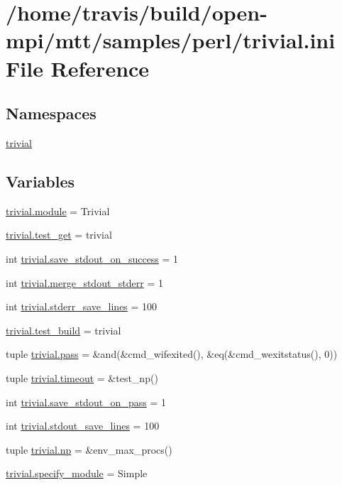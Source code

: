 \hypertarget{trivial_8ini}{\section{/home/travis/build/open-\/mpi/mtt/samples/perl/trivial.ini File Reference}
\label{trivial_8ini}
}
\subsection*{Namespaces}
\begin{DoxyCompactItemize}
\item 
\hyperlink{namespacetrivial}{trivial}
\end{DoxyCompactItemize}
\subsection*{Variables}
\begin{DoxyCompactItemize}
\item 
\hyperlink{namespacetrivial_a3e713ea5d6e77bf165eeaafc02275430}{trivial.\-module} = Trivial
\item 
\hyperlink{namespacetrivial_afe75cace659f04749ee3f7c818152b7b}{trivial.\-test\-\_\-get} = trivial
\item 
int \hyperlink{namespacetrivial_af272dc5ab194f706f77eeb74de7b8c97}{trivial.\-save\-\_\-stdout\-\_\-on\-\_\-success} = 1
\item 
int \hyperlink{namespacetrivial_a8c1d5357654e053cf4d0b8a7f48ff13b}{trivial.\-merge\-\_\-stdout\-\_\-stderr} = 1
\item 
int \hyperlink{namespacetrivial_af6ee4456e84c354e7845aae7ea24d022}{trivial.\-stderr\-\_\-save\-\_\-lines} = 100
\item 
\hyperlink{namespacetrivial_aa612b0f8daffd666959f885b6ba54cd0}{trivial.\-test\-\_\-build} = trivial
\item 
tuple \hyperlink{namespacetrivial_a65b4003f52ce4fa5d324695f54c1e3b3}{trivial.\-pass} = \&and(\&cmd\-\_\-wifexited(), \&eq(\&cmd\-\_\-wexitstatus(), 0))
\item 
tuple \hyperlink{namespacetrivial_a8ce5c7e487f1c21edda391cc47830f5e}{trivial.\-timeout} = \&test\-\_\-np()
\item 
int \hyperlink{namespacetrivial_aefbe39eb9fcb8a58d4e04dd980e35062}{trivial.\-save\-\_\-stdout\-\_\-on\-\_\-pass} = 1
\item 
int \hyperlink{namespacetrivial_aee208868790b8c2d6d9f48ad238aa6c5}{trivial.\-stdout\-\_\-save\-\_\-lines} = 100
\item 
tuple \hyperlink{namespacetrivial_adfe4da0e2d8f3078b198c0f76ee394dd}{trivial.\-np} = \&env\-\_\-max\-\_\-procs()
\item 
\hyperlink{namespacetrivial_af5dae1522345f303cfb4527587cd5361}{trivial.\-specify\-\_\-module} = Simple
\end{DoxyCompactItemize}
